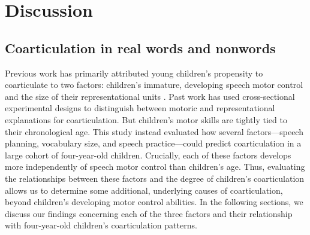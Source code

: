 \documentclass[a4paper,man,natbib,donotrepeattitle, apacite]{apa6}
\begin{document}
\section{Discussion}

\subsection{Coarticulation in real words and nonwords}

Previous work has primarily attributed young children’s propensity to coarticulate to two factors: children’s immature, developing speech motor control \cite{barbierWhatAnticipatoryCoarticulation2020,rubertusDevelopmentGesturalOrganization2018,zharkovaDynamicsVoicelessSibilant2018} and the size of their representational units \cite{nittrouerEmergencePhoneticSegments1989,nittrouerHowChildrenLearn1996,noiraySpokenLanguageDevelopment2019,zharkovaCoarticulationIndicatorSpeech2011}. Past work has used cross-sectional experimental designs to distinguish between motoric and representational explanations for coarticulation. But children's motor skills are tightly tied to their chronological age. This study instead evaluated how several factors---speech planning, vocabulary size, and speech practice---could predict coarticulation in a large cohort of four-year-old children.  Crucially, each of these factors develops more independently of speech motor control than children's age. Thus, evaluating the relationships between these factors and the degree of children’s coarticulation allows us to determine some additional, underlying causes of coarticulation, beyond children’s developing motor control abilities. In the following sections, we discuss our findings concerning each of the three factors and their relationship with four-year-old children’s coarticulation patterns. 
\end{document}
